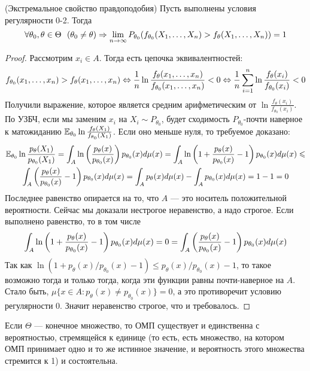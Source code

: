 \begin{theorem} (Экстремальное свойство правдоподобия)
	Пусть выполнены условия регулярности 0-2. Тогда
	\[
		\forall \theta_0, \theta \in \Theta\ \ (\theta_0 \neq \theta) \Rightarrow \lim_{n \to \infty} P_{\theta_0}(f_{\theta_0}(X_1, \ldots, X_n) > f_\theta(X_1, \ldots, X_n)) = 1
	\]
\end{theorem}

\begin{proof}
	Рассмотрим $x_i \in A$. Тогда есть цепочка эквивалентностей:
	\[
		f_{\theta_0}(x_1, \ldots, x_n) > f_\theta(x_1, \ldots, x_n) \Leftrightarrow \frac{1}{n}\ln\frac{f_\theta(x_1, \ldots, x_n)}{f_{\theta_0}(x_1, \ldots, x_n)} < 0 \Leftrightarrow \frac{1}{n}\sum_{i = 1}^n \ln\frac{f_\theta(x_i)}{f_{\theta_0}(x_i)} < 0
	\]
	Получили выражение, которое является средним арифметическим от $\ln\frac{f_\theta(x_i)}{f_{\theta_0}(x_i)}$. По УЗБЧ, если мы заменим $x_i$ на $X_i \sim P_{\theta_0}$, будет сходимость $P_{\theta_0}$-почти наверное к матожиданию $\mathbb{E}_{\theta_0} \ln\frac{f_\theta(X_1)}{f_{\theta_0}(X_1)}$. Если оно меньше нуля, то требуемое доказано:
	\begin{multline*}
		\mathbb{E}_{\theta_0} \ln\frac{p_\theta(X_1)}{p_{\theta_0}(X_1)} = \int_A \ln\left(\frac{p_\theta(x)}{p_{\theta_0}(x)}\right)p_{\theta_0}(x)d\mu(x) = \int_A \ln\left(1 + \frac{p_\theta(x)}{p_{\theta_0}(x)} - 1\right)p_{\theta_0}(x)d\mu(x) \leqslant
		\\
		\int_A \left(\frac{p_\theta(x)}{p_{\theta_0}(x)} - 1\right)p_{\theta_0}(x)d\mu(x) = \int_A p_\theta(x)d\mu(x) - \int_A p_{\theta_0}(x)d\mu(x) = 1 - 1 = 0
	\end{multline*}
	Последнее равенство опирается на то, что $A$ --- это носитель положительной вероятности. Сейчас мы доказали нестрогое неравенство, а надо строгое. Если выполнено равенство, то в том числе
	\[
		\int_A \ln\left(1 + \frac{p_\theta(x)}{p_{\theta_0}(x)} - 1\right)p_{\theta_0}(x)d\mu(x) = 0 = \int_A \left(\frac{p_\theta(x)}{p_{\theta_0}(x)} - 1\right)p_{\theta_0}(x)d\mu(x)
	\]
	Так как $\ln(1 + p_\theta(x) / p_{\theta_0}(x) - 1) \le p_\theta(x) / p_{\theta_0}(x) - 1$, то такое возможно тогда и только тогда, когда эти функции равны почти-наверное на $A$. Стало быть, $\mu\{x \in A \colon p_\theta(x) \neq p_{\theta_0}(x)\} = 0$, а это противоречит условию регулярности 0. Значит неравенство строгое, что и требовалось.
\end{proof}

\begin{corollary}
	Если $\Theta$ --- конечное множество, то ОМП существует и единственна с вероятностью, стремящейся к единице (то есть, есть множество, на котором ОМП принимает одно и то же истинное значение, и вероятность этого множества стремится к 1) и состоятельна.
\end{corollary}

